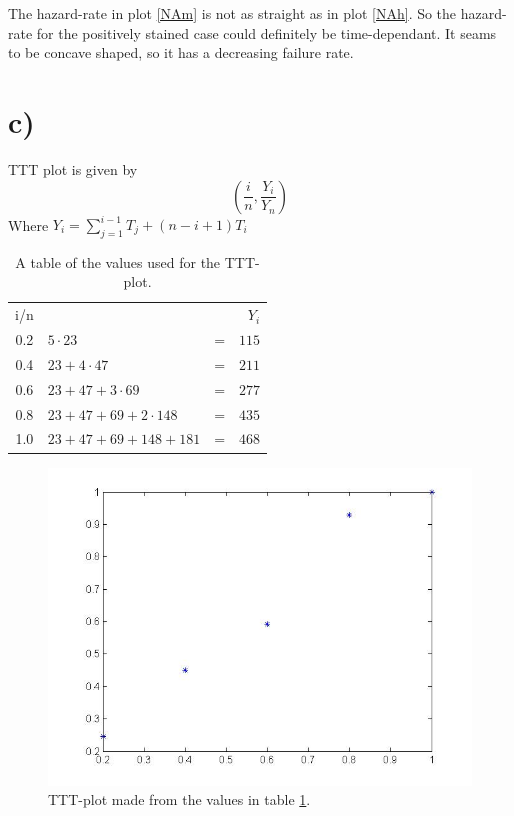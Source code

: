 \documentclass[10pt, a4paper]{article}
\begin{document}
The hazard-rate in plot \ref{NAm} is not as straight as in plot \ref{NAh}. So the hazard-rate for the positively stained case could definitely be time-dependant. It seams to be concave shaped, so it has a decreasing failure rate. 
\section*{c)}

TTT plot is given by $$ (\frac{i}{n}, \frac{Y_i}{Y_n}) $$
Where $Y_i = \sum \limits_{j = 1}^{i-1} T_j + (n-i+1)T_i  $ 

\begin{center}
\begin{table}[h!]
\centering
\begin{tabular}{ c l c r }

	i/n &  & & $Y_i$\\
0.2	& $5\cdot 23 $ & = & $ 115 $\\
0.4	&$ 23+4\cdot47 $ & = & $ 211 $\\
0.6	&$ 23+47+3\cdot69 $ & = & $277$ \\
0.8	&$ 23+47+69+2\cdot148 $ & = & $ 435 $ \\
1.0 &$ 23+47+69+148+181 $ & = & $ 468 $\\
\end{tabular}
\caption{A table of the values used for the TTT-plot.}
\label{TTTt}
\end{table}
\end{center}

\begin{center}
\begin{figure}[h!]
\centering
\includegraphics[scale=0.50]{TTT1}
\caption{TTT-plot made from the values in table \ref{TTTt}.}
\label{TTTh}
\end{figure}
\end{center}
\end{document}
